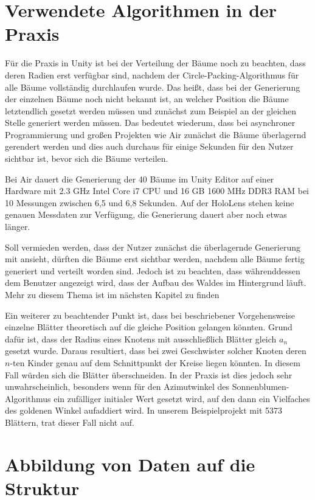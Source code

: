 \section{Verwendete Algorithmen in der Praxis}

Für die Praxis in Unity ist bei der Verteilung der Bäume noch zu beachten, dass deren Radien erst verfügbar sind, nachdem der Circle-Packing-Algorithmus für alle Bäume vollständig durchlaufen wurde. Das heißt, dass bei der Generierung der einzelnen Bäume noch nicht bekannt ist, an welcher Position die Bäume letztendlich gesetzt werden müssen und zunächst zum Beispiel an der gleichen Stelle generiert werden müssen. Das bedeutet wiederum, dass bei asynchroner Programmierung und großen Projekten wie Air zunächst die Bäume überlagernd gerendert werden und dies auch durchaus für einige Sekunden für den Nutzer sichtbar ist, bevor sich die Bäume verteilen.

Bei Air dauert die Generierung der 40 Bäume im Unity Editor auf einer Hardware mit 2.3 GHz Intel Core i7 CPU und 16 GB 1600 MHz DDR3 RAM bei 10 Messungen zwischen 6,5 und 6,8 Sekunden. Auf der HoloLens stehen keine genauen Messdaten zur Verfügung, die Generierung dauert aber noch etwas länger.

Soll vermieden werden, dass der Nutzer zunächst die überlagernde Generierung mit ansieht, dürften die Bäume erst sichtbar werden, nachdem alle Bäume fertig generiert und verteilt worden sind. Jedoch ist zu beachten, dass währenddessen dem Benutzer angezeigt wird, dass der Aufbau des Waldes im Hintergrund läuft. Mehr zu diesem Thema ist im nächsten Kapitel zu finden

Ein weiterer zu beachtender Punkt ist, dass bei beschriebener Vorgehensweise einzelne Blätter theoretisch auf die gleiche Position gelangen könnten. Grund dafür ist, dass der Radius eines Knotens mit ausschließlich Blätter gleich $a_n$ gesetzt wurde. Daraus resultiert, dass bei zwei Geschwister solcher Knoten deren $n$-ten Kinder genau auf dem Schnittpunkt der Kreise liegen könnten. In diesem Fall würden sich die Blätter überschneiden. In der Praxis ist dies jedoch sehr unwahrscheinlich, besonders wenn für den Azimutwinkel des Sonnenblumen-Algorithmus ein zufälliger initialer Wert gesetzt wird, auf den dann ein Vielfaches des goldenen Winkel aufaddiert wird. In unserem Beispielprojekt mit 5373 Blättern, trat dieser Fall nicht auf.

\section{Abbildung von Daten auf die Struktur}

